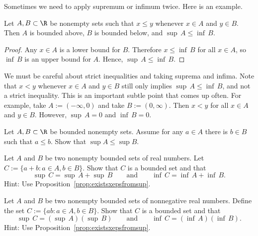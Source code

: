 \documentclass[12pt]{book}
\begin{document}
Sometimes we need to apply supremum or infimum twice. 
Here is an example.

\begin{prop} \label{infsupineq:prop}
Let $A, B \subset \R$ be nonempty sets such that $x \leq y$ whenever $x \in A$ and
$y \in B$.
Then $A$ is bounded above, $B$ is bounded below, and $\sup\, A \leq \inf\, B$.
\end{prop}

\begin{proof}
Any $x \in A$ is a lower bound for $B$.  
Therefore $x \leq \inf\, B$ for all $x \in A$, so $\inf\, B$ is an upper bound for
$A$.
Hence, $\sup\, A \leq \inf\, B$.
\end{proof}

We must be careful about strict inequalities and taking suprema and
infima.  
Note that $x < y$ whenever $x \in A$ and $y \in B$ still only implies $\sup\, A \leq \inf\, B$, and not a strict inequality.  
This is an important subtle point that comes up often.
For example, take $A := (-\infty,0)$ and take $B := (0,\infty)$.
Then $x < y$ for all $x \in A$ and $y \in B$.  
However, $\sup\, A = 0$ and $\inf\, B = 0$.


\begin{exercise}
Let $A,B\subset \R$ be bounded nonempty sets.
Assume for any $a\in A$ there is $b\in B$ such that $a\le b$.
Show that $\sup A\le \sup B$.
\end{exercise}


\begin{exercise} \label{exercise:supofsum}
Let $A$ and $B$ be two nonempty bounded sets of real numbers.
Let
$C := \{ a+b : a \in A, b \in B \}$.
Show that $C$ is a bounded set and that
\begin{equation*}
\sup\,C = \sup\,A + \sup\,B 
\qquad \text{and} \qquad
\inf\,C = \inf\,A + \inf\,B .
\end{equation*}
Hint: Use Proposition~\ref{prop:existsxepsfromsup}.
\end{exercise}

\begin{exercise}
Let $A$ and $B$ be two nonempty bounded sets of nonnegative real numbers.
Define the set
$C := \{ ab : a \in A, b \in B \}$.
Show that $C$ is a bounded set and that
\begin{equation*}
\sup\,C = (\sup\,A )( \sup\,B) 
\qquad \text{and} \qquad
\inf\,C = (\inf\,A )( \inf\,B).
\end{equation*}
Hint: Use Proposition~\ref{prop:existsxepsfromsup}.
\end{exercise}
\end{document}
